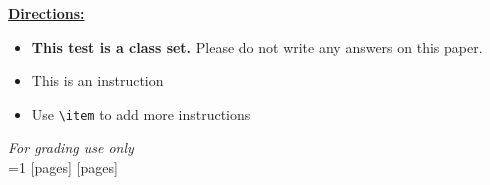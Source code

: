 \documentclass[addpoints]{exam}
\def\type{0}
\begin{document}
\begin{coverpages}
\noindent\textbf{\underline{Directions:}}
\begin{itemize}
    \ifnum\type=1 \item \textbf{This test is a class set.} Please do not write any answers on this paper. \fi
    \item This is an instruction
    \item Use \verb+\item+ to add more instructions
\end{itemize}
\begin{center}
\textit{For grading use only}\\
\ifnum\type=1
    [pages]    
\else
    [pages]    
\fi

\end{center}
\end{coverpages}

\newpage
\hspace{0.1em}\vspace{-1cm}


\end{document}
